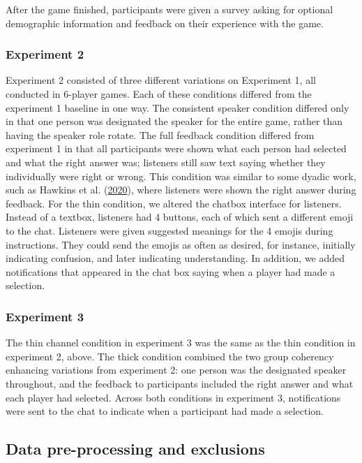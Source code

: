 \documentclass[
  english,
]{article}
\begin{document}
After the game finished, participants were given a survey asking for optional demographic information and feedback on their experience with the game.

\hypertarget{experiment-2}{%
\subsubsection{Experiment 2}\label{experiment-2}}

Experiment 2 consisted of three different variations on Experiment 1, all conducted in 6-player games. Each of these conditions differed from the experiment 1 baseline in one way. The consistent speaker condition differed only in that one person was designated the speaker for the entire game, rather than having the speaker role rotate. The full feedback condition differed from experiment 1 in that all participants were shown what each person had selected and what the right answer was; listeners still saw text saying whether they individually were right or wrong. This condition was similar to some dyadic work, such as Hawkins et al. (\protect\hyperlink{ref-hawkins2020}{2020}), where listeners were shown the right answer during feedback. For the thin condition, we altered the chatbox interface for listeners. Instead of a textbox, listeners had 4 buttons, each of which sent a different emoji to the chat. Listeners were given suggested meanings for the 4 emojis during instructions. They could send the emojis as often as desired, for instance, initially indicating confusion, and later indicating understanding. In addition, we added notifications that appeared in the chat box saying when a player had made a selection.

\hypertarget{experiment-3}{%
\subsubsection{Experiment 3}\label{experiment-3}}

The thin channel condition in experiment 3 was the same as the thin condition in experiment 2, above. The thick condition combined the two group coherency enhancing variations from experiment 2: one person was the designated speaker throughout, and the feedback to participants included the right answer and what each player had selected. Across both conditions in experiment 3, notifications were sent to the chat to indicate when a participant had made a selection.

\hypertarget{data-pre-processing-and-exclusions}{%
\subsection{Data pre-processing and exclusions}\label{data-pre-processing-and-exclusions}}
\end{document}
